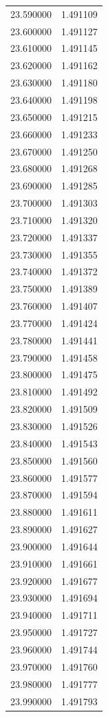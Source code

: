\begin{tabular}{rr}
23.590000 & 1.491109 \\
23.600000 & 1.491127 \\
23.610000 & 1.491145 \\
23.620000 & 1.491162 \\
23.630000 & 1.491180 \\
23.640000 & 1.491198 \\
23.650000 & 1.491215 \\
23.660000 & 1.491233 \\
23.670000 & 1.491250 \\
23.680000 & 1.491268 \\
23.690000 & 1.491285 \\
23.700000 & 1.491303 \\
23.710000 & 1.491320 \\
23.720000 & 1.491337 \\
23.730000 & 1.491355 \\
23.740000 & 1.491372 \\
23.750000 & 1.491389 \\
23.760000 & 1.491407 \\
23.770000 & 1.491424 \\
23.780000 & 1.491441 \\
23.790000 & 1.491458 \\
23.800000 & 1.491475 \\
23.810000 & 1.491492 \\
23.820000 & 1.491509 \\
23.830000 & 1.491526 \\
23.840000 & 1.491543 \\
23.850000 & 1.491560 \\
23.860000 & 1.491577 \\
23.870000 & 1.491594 \\
23.880000 & 1.491611 \\
23.890000 & 1.491627 \\
23.900000 & 1.491644 \\
23.910000 & 1.491661 \\
23.920000 & 1.491677 \\
23.930000 & 1.491694 \\
23.940000 & 1.491711 \\
23.950000 & 1.491727 \\
23.960000 & 1.491744 \\
23.970000 & 1.491760 \\
23.980000 & 1.491777 \\
23.990000 & 1.491793 \\

\end{tabular}
